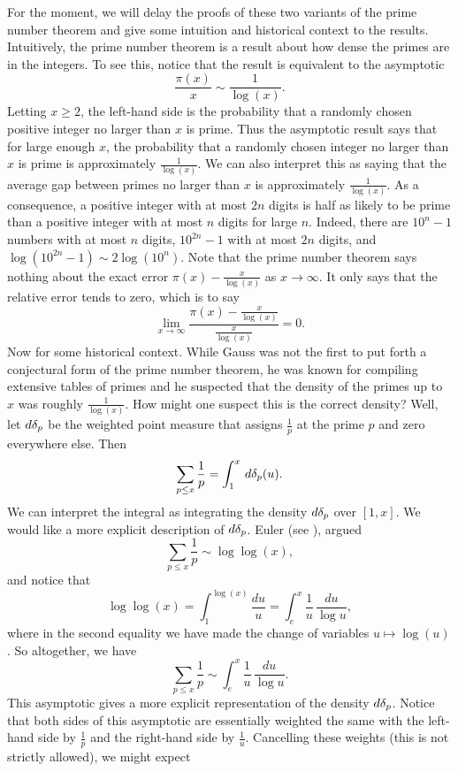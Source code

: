     For the moment, we will delay the proofs of these two variants of the prime number theorem and give some intuition and historical context to the results. Intuitively, the prime number theorem is a result about how dense the primes are in the integers. To see this, notice that the result is equivalent to the asymptotic
    \[
      \frac{\pi(x)}{x} \sim \frac{1}{\log(x)}.
    \]
    Letting $x \ge 2$, the left-hand side is the probability that a randomly chosen positive integer no larger than $x$ is prime. Thus the asymptotic result says that for large enough $x$, the probability that a randomly chosen integer no larger than $x$ is prime is approximately $\frac{1}{\log(x)}$. We can also interpret this as saying that the average gap between primes no larger than $x$ is approximately $\frac{1}{\log(x)}$. As a consequence, a positive integer with at most $2n$ digits is half as likely to be prime than a positive integer with at most $n$ digits for large $n$. Indeed, there are $10^{n}-1$ numbers with at most $n$ digits, $10^{2n}-1$ with at most $2n$ digits, and $\log(10^{2n}-1) \sim 2\log(10^{n})$. Note that the prime number theorem says nothing about the exact error $\pi(x)-\frac{x}{\log(x)}$ as $x \to \infty$. It only says that the relative error tends to zero, which is to say
    \[
      \lim_{x \to \infty}\frac{\pi(x)-\frac{x}{\log(x)}}{\frac{x}{\log(x)}} = 0.
    \]
    Now for some historical context. While Gauss was not the first to put forth a conjectural form of the prime number theorem, he was known for compiling extensive tables of primes and he suspected that the density of the primes up to $x$ was roughly $\frac{1}{\log(x)}$. How might one suspect this is the correct density? Well, let $d\delta_{p}$ be the weighted point measure that assigns $\frac{1}{p}$ at the prime $p$ and zero everywhere else. Then
    \[
      \sum_{p \le x}\frac{1}{p} = \int_{1}^{x}\,d\delta_{p}(u).
    \]
    We can interpret the integral as integrating the density $d\delta_{p}$ over $[1,x]$. We would like a more explicit description of $d\delta_{p}$. Euler (see \cite{euler1744variae}), argued
    \[
      \sum_{p \le x}\frac{1}{p} \sim \log\log(x),
    \]
    and notice that
    \[
      \log\log(x) = \int_{1}^{\log(x)}\frac{du}{u} = \int_{e}^{x}\frac{1}{u}\,\frac{du}{\log{u}},
    \]
    where in the second equality we have made the change of variables $u \mapsto \log(u)$. So altogether, we have
    \[
      \sum_{p \le x}\frac{1}{p} \sim \int_{e}^{x}\frac{1}{u}\,\frac{du}{\log{u}}.
    \]
    This asymptotic gives a more explicit representation of the density $d\delta_{p}$. Notice that both sides of this asymptotic are essentially weighted the same with the left-hand side by $\frac{1}{p}$ and the right-hand side by $\frac{1}{u}$. Cancelling these weights (this is not strictly allowed), we might expect
